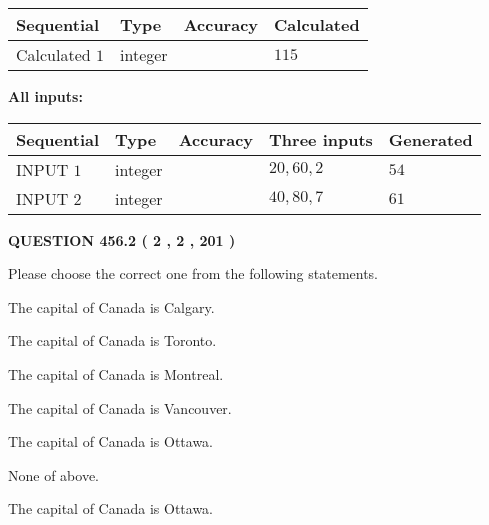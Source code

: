 \documentclass[12pt]{article}
\begin{document}
   
  
  
\noindent\begin{tabular}{|l|l|l|l|}
\hline
 Sequential & Type & Accuracy & Calculated \\ 
\hline
 
 
  Calculated $  1 $ & integer &  & 
  $ 115 $ 
 \\  \hline  
 \end{tabular}
   
   
   
   
\noindent\vspace{0.1in}\hspace{-0.08in} {\textbf{\Large{All inputs: }}}
   
   
  
  
\noindent\begin{tabular}{|l|l|l|l|l|}
\hline
 Sequential & Type & Accuracy & Three inputs & Generated \\ 
\hline
 
 
  INPUT $  1 $ & integer &  & $
 20
 , 
 60
 , 
 2
 $ & $ 54 $ 
 \\  \hline  
 
 
  INPUT $  2 $ & integer &  & $
 40
 , 
 80
 , 
 7
 $ & $ 61 $ 
 \\  \hline  
 \end{tabular}
   
   
  
\vspace{0.2in}
  
{\textbf{\Large{QUESTION
456.2 
 ( 2 , 2 , 201 )
}}}
  
  
Please choose the correct one from the following statements.
 
 
The capital of Canada is Calgary.
 
 
The capital of Canada is Toronto.
 
 
The capital of Canada is Montreal.
 
 
The capital of Canada is Vancouver.
 
 
The capital of Canada is Ottawa.
 
 
 None of above.
 
 
\noindent{}
 
 
The capital of Canada is Ottawa.
 
\end{document}
